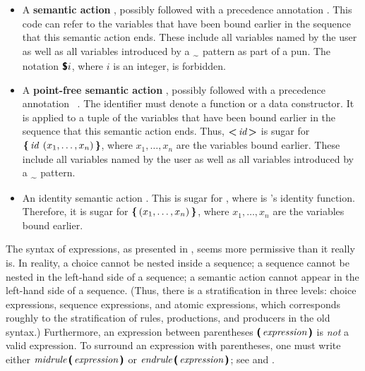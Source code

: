 \documentclass[onecolumn,11pt,nocopyrightspace,preprint]{sigplanconf}
\begin{document}
\begin{itemize}
\item
  A \textbf{semantic action} \daction,
  possibly followed with a precedence annotation \dprec {}.
  This \ocaml code can refer to the variables that have been bound
  earlier in the sequence that this semantic action ends.
  These include all variables named by the user as well as all
  variables introduced by a $\dtilde$ pattern as part of a pun.
  The notation $\text{\upshape\sf\bfseries \$}i$, where $i$ is an integer, is forbidden.

\item
  A \textbf{point-free semantic action} ,
  possibly followed with a precedence annotation \dprec~.
  The \ocaml identifier  must denote a function or a data
  constructor. It is applied to a tuple of the variables that have
  been bound earlier in the sequence that this semantic action ends.
  Thus, $\text{\upshape\sf\bfseries <} \,\textit{id}\, \text{\upshape\sf\bfseries >}$ is sugar for
  $\text{\upshape\sf\bfseries \{} \,\textit{id}\;\,(x_1, \ldots, x_n)\, \text{\upshape\sf\bfseries \}}$,
  where $x_1, \ldots, x_n$ are the variables bound earlier.
  These include all variables named by the user as well as all
  variables introduced by a $\dtilde$ pattern.

\item
  An identity semantic action \dpfidentityaction. This is sugar for
  , where  is \ocaml's
  identity function.
  Therefore, it is sugar for
  $\text{\upshape\sf\bfseries \{} \,(x_1, \ldots, x_n)\, \text{\upshape\sf\bfseries \}}$,
  where $x_1, \ldots, x_n$ are the variables bound earlier.
\end{itemize}

The syntax of expressions, as presented in , seems more
permissive than it really is. In reality, a choice cannot be nested inside a
sequence;
a sequence cannot be nested in the left-hand side of a sequence; a semantic
action cannot appear in the left-hand side of a sequence. (Thus, there is a
stratification in three levels: choice expressions, sequence expressions, and
atomic expressions, which corresponds roughly to the stratification of rules,
productions, and producers in the old syntax.)
%
Furthermore, an expression between parentheses
$\text{\upshape\sf\bfseries (}\, \textit{expression} \,\text{\upshape\sf\bfseries )}$ is \emph{not} a valid expression.
To surround an expression with parentheses, one must write either
$\textit{midrule}\, \text{\upshape\sf\bfseries (}\, \textit{expression} \,\text{\upshape\sf\bfseries )}$ or
$\textit{endrule}\, \text{\upshape\sf\bfseries (}\, \textit{expression} \,\text{\upshape\sf\bfseries )}$;
see  and .
\end{document}
